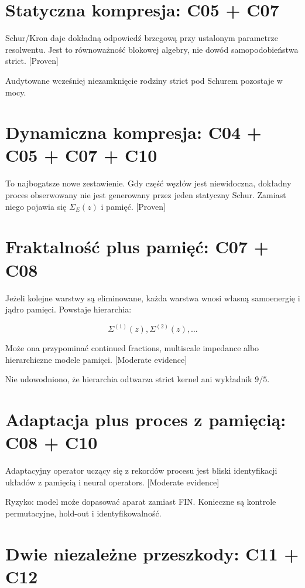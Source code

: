 \documentclass[11pt,a4paper,openany]{report}
\newcommand{\statusProven}{\textcolor{fingreen}{[Proven]}}
\newcommand{\statusModerate}{\textcolor{finviolet}{[Moderate evidence]}}
\begin{document}
\section{Statyczna kompresja: C05 + C07}

Schur/\allowbreak{}Kron daje dokładną odpowiedź brzegową przy ustalonym parametrze resolwentu. Jest to równowa\.zność blokowej algebry, nie dowód samopodobieństwa strict. \statusProven{}

Audytowane wcześniej niezamknięcie rodziny strict pod Schurem pozostaje w mocy.

\section{Dynamiczna kompresja: C04 + C05 + C07 + C10}

To najbogatsze nowe zestawienie. Gdy część węzłów jest niewidoczna, dokładny proces obserwowany nie jest generowany przez jeden statyczny Schur. Zamiast niego pojawia się \(\Sigma_E(z)\) i pamięć. \statusProven{}

\section{Fraktalność plus pamięć: C07 + C08}

Je\.zeli kolejne warstwy są eliminowane, ka\.zda warstwa wnosi własną samoenergię i jądro pamięci. Powstaje hierarchia:

\[
\Sigma^{(1)}(z),\Sigma^{(2)}(z),\ldots
\]

Mo\.ze ona przypominać continued fractions, multiscale impedance albo hierarchiczne modele pamięci. \statusModerate{}

Nie udowodniono, \.ze hierarchia odtwarza strict kernel ani wykładnik \(9/5\).

\section{Adaptacja plus proces z pamięcią: C08 + C10}

Adaptacyjny operator uczący się z rekordów procesu jest bliski identyfikacji układów z pamięcią i neural operators. \statusModerate{}

Ryzyko: model mo\.ze dopasować aparat zamiast FIN. Konieczne są kontrole permutacyjne, hold-out i identyfikowalność.

\section{Dwie niezale\.zne przeszkody: C11 + C12}
\end{document}
